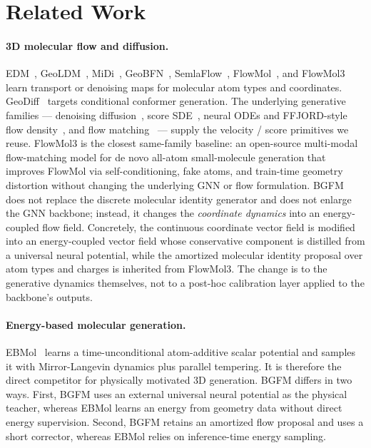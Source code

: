 \documentclass{article}
\begin{document}
\section{Related Work}

\paragraph{3D molecular flow and diffusion.}
EDM~\citep{edm}, GeoLDM~\citep{geoldm}, MiDi~\citep{midi},
GeoBFN~\citep{geobfn}, SemlaFlow~\citep{semlaflow},
FlowMol~\citep{flowmol}, and FlowMol3~\citep{flowmol3} learn
transport or denoising maps for molecular atom types and coordinates.
GeoDiff~\citep{geodiff} targets conditional conformer generation. The
underlying generative families --- denoising diffusion~\citep{ddpm},
score SDE~\citep{scoresde}, neural ODEs and FFJORD-style flow
density~\citep{neuralode, ffjord}, and flow matching~\citep{flowmatching}
--- supply the velocity / score primitives we reuse. FlowMol3 is the
closest same-family baseline: an open-source multi-modal flow-matching model
for de novo all-atom small-molecule generation that improves FlowMol via
self-conditioning, fake atoms, and train-time geometry distortion without
changing the underlying GNN or flow formulation.  BGFM does not replace
the discrete molecular identity generator and does not enlarge the GNN
backbone; instead, it changes the \emph{coordinate dynamics} into an
energy-coupled flow field. Concretely, the continuous coordinate vector
field is modified into an energy-coupled vector field whose conservative
component is distilled from a universal neural potential, while the
amortized molecular identity proposal over atom types and charges is
inherited from FlowMol3. The change is to the generative dynamics
themselves, not to a post-hoc calibration layer applied to the
backbone's outputs.

\paragraph{Energy-based molecular generation.}
EBMol~\citep{ebmol} learns a time-unconditional atom-additive scalar potential and
samples it with Mirror-Langevin dynamics plus parallel tempering. It is
therefore the direct competitor for physically motivated 3D generation.
BGFM differs in two ways. First, BGFM uses an external universal neural
potential as the physical teacher, whereas EBMol learns an energy from
geometry data without direct energy supervision. Second, BGFM retains an
amortized flow proposal and uses a short corrector, whereas EBMol relies
on inference-time energy sampling.
\end{document}
